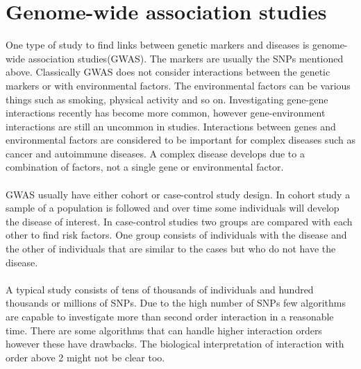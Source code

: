 \documentclass[10pt,a4paper]{report}
\begin{document}
\section{Genome-wide association studies}
One type of study to find links between genetic markers and diseases is genome-wide association studies(GWAS). The markers are usually the SNPs mentioned above. Classically GWAS does not consider interactions between the genetic markers or with environmental factors. The environmental factors can be various things such as smoking, physical activity and so on.  Investigating gene-gene interactions recently has become more common\cite{cordell_detect_review}, however gene-environment interactions are still an uncommon in studies\cite{gene_enviroment_2013}. Interactions between genes and environmental factors are considered to be important for complex diseases such as cancer and autoimmune diseases\cite{cordell_detect_review, gene_enviroment_2013, geira, ra_smoking}. A complex disease develops due to a combination of factors, not a single gene or environmental factor\cite{rothman1998modern}.\\
\\
GWAS usually have either cohort or case-control study design. In cohort study a sample of a population is followed and over time some individuals will develop the disease of interest. In case-control studies two groups are compared with each other to find risk factors. One group consists of individuals with the disease and the other of individuals that are similar to the cases but who do not have the disease.\cite{rothman1998modern,mann_observational}\\
\\
A typical study consists of tens of thousands of individuals and hundred thousands or millions of SNPs. Due to the high number of SNPs few algorithms are capable to investigate more than second order interaction in a reasonable time. There are some algorithms that can handle higher interaction orders however these have drawbacks\cite{gwis,high_order_2012,fast_high_order_cluster}. The biological interpretation of interaction with order above 2 might not be clear too. %
\end{document}
